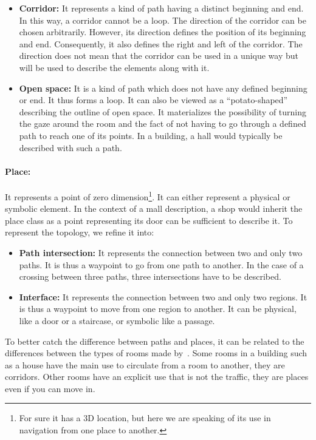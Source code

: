 \begin{itemize}
  \item \textbf{Corridor:} It represents a kind of path having a distinct beginning and end. In this way, a corridor cannot be a loop. The direction of the corridor can be chosen arbitrarily. However, its direction defines the position of its beginning and end. Consequently, it also defines the right and left of the corridor. The direction does not mean that the corridor can be used in a unique way but will be used to describe the elements along with it.
  \item \textbf{Open space:} It is a kind of path which does not have any defined beginning or end. It thus forms a loop. It can also be viewed as a ``potato-shaped'' describing the outline of open space. It materializes the possibility of turning the gaze around the room and the fact of not having to go through a defined path to reach one of its points. In a building, a hall would typically be described with such a path.
\end{itemize}

\paragraph{Place:} It represents a point of zero dimension\footnote{For sure it has a 3D location, but here we are speaking of its use in navigation from one place to another.}. It can either represent a physical or symbolic element. In the context of a mall description, a shop would inherit the place class as a point representing its door can be sufficient to describe it. To represent the topology, we refine it into:
  
\begin{itemize}
  \item \textbf{Path intersection:} It represents the connection between two and only two paths. It is thus a waypoint to go from one path to another. In the case of a crossing between three paths, three intersections have to be described.
  \item \textbf{Interface:} It represents the connection between two and only two regions. It is thus a waypoint to move from one region to another. It can be physical, like a door or a staircase, or symbolic like a passage.
\end{itemize}

To better catch the difference between paths and places, it can be related to the differences between the types of rooms made by~\cite{andresen_2016_wayfinding}. Some rooms in a building such as a house have the main use to circulate from a room to another, they are corridors. Other rooms have an explicit use that is not the traffic, they are places even if you can move in.

